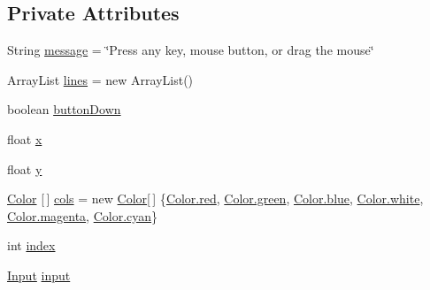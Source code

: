 \subsection*{Private Attributes}
\begin{DoxyCompactItemize}
\item 
String \mbox{\hyperlink{classorg_1_1newdawn_1_1slick_1_1tests_1_1_input_test_a998b4c1fcea34c27835b531bd6afa539}{message}} = \char`\"{}Press any key, mouse button, or drag the mouse\char`\"{}
\item 
Array\+List \mbox{\hyperlink{classorg_1_1newdawn_1_1slick_1_1tests_1_1_input_test_a374f7c88e7762229c37797c84638135c}{lines}} = new Array\+List()
\item 
boolean \mbox{\hyperlink{classorg_1_1newdawn_1_1slick_1_1tests_1_1_input_test_aaa3058a9f1d4a84c36dfc06c5e43944b}{button\+Down}}
\item 
float \mbox{\hyperlink{classorg_1_1newdawn_1_1slick_1_1tests_1_1_input_test_a95f99c94f1e661a629501a3205d78c15}{x}}
\item 
float \mbox{\hyperlink{classorg_1_1newdawn_1_1slick_1_1tests_1_1_input_test_a18ce34ad5ddc268a0420c747d5b19d05}{y}}
\item 
\mbox{\hyperlink{classorg_1_1newdawn_1_1slick_1_1_color}{Color}} \mbox{[}$\,$\mbox{]} \mbox{\hyperlink{classorg_1_1newdawn_1_1slick_1_1tests_1_1_input_test_aa47416e5547479b70449ee52df673561}{cols}} = new \mbox{\hyperlink{classorg_1_1newdawn_1_1slick_1_1_color}{Color}}\mbox{[}$\,$\mbox{]} \{\mbox{\hyperlink{classorg_1_1newdawn_1_1slick_1_1_color_aa9735c6217da1b515582e7f2273daeb6}{Color.\+red}}, \mbox{\hyperlink{classorg_1_1newdawn_1_1slick_1_1_color_a1cd4406bbd518aeb8baefcf19df24424}{Color.\+green}}, \mbox{\hyperlink{classorg_1_1newdawn_1_1slick_1_1_color_af55c4f4e0af464d15cf85939058f4567}{Color.\+blue}}, \mbox{\hyperlink{classorg_1_1newdawn_1_1slick_1_1_color_afcd91cbdd26233d226d734f70dca3d2e}{Color.\+white}}, \mbox{\hyperlink{classorg_1_1newdawn_1_1slick_1_1_color_ab806bfc25e9cab954c1056a692ef6925}{Color.\+magenta}}, \mbox{\hyperlink{classorg_1_1newdawn_1_1slick_1_1_color_ae296d247f4920ee8be313168843d4710}{Color.\+cyan}}\}
\item 
int \mbox{\hyperlink{classorg_1_1newdawn_1_1slick_1_1tests_1_1_input_test_a9081fd3676382bf0fc4160dbe0d4738e}{index}}
\item 
\mbox{\hyperlink{classorg_1_1newdawn_1_1slick_1_1_input}{Input}} \mbox{\hyperlink{classorg_1_1newdawn_1_1slick_1_1tests_1_1_input_test_a0f7ab1cf90c55a44d41928128e6a37a8}{input}}
\item 

\end{DoxyCompactItemize}
